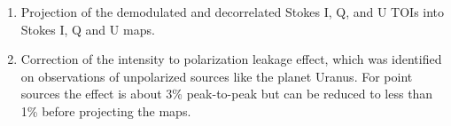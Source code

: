 \documentclass[twocolumn,traditabstract]{aa}
\begin{document}
\begin{enumerate}
\item Projection of the demodulated and decorrelated Stokes I, Q, and U TOIs into Stokes I, Q and U maps.

\item Correction of the intensity to polarization leakage effect, which was
  identified on observations of unpolarized sources like the planet Uranus. For
  point sources the effect is about 3\% peak-to-peak but can be reduced to
    less than 1\% \citep{ritacco2017} before projecting the maps.



\end{enumerate}
\end{document}
